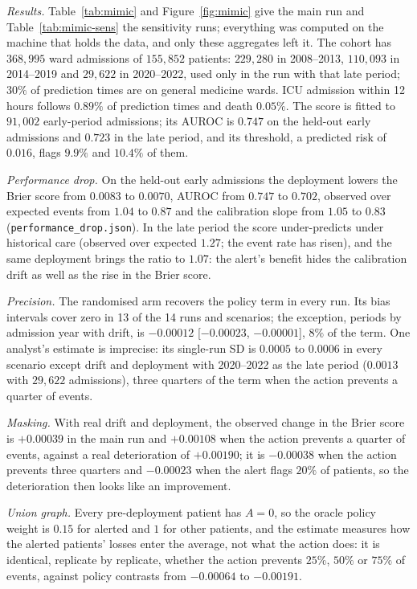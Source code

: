 \documentclass[letterpaper]{article} %
\begin{document}
\emph{Results.} Table~\ref{tab:mimic} and Figure~\ref{fig:mimic} give the
main run and Table~\ref{tab:mimic-sens} the sensitivity runs; everything was
computed on the machine that holds the data, and only these aggregates left
it. The cohort has $368{,}995$ ward admissions of $155{,}852$ patients:
$229{,}280$ in 2008--2013, $110{,}093$ in 2014--2019 and $29{,}622$ in
2020--2022, used only in the run with that late period; $30\%$ of prediction
times are on general medicine wards. ICU admission within 12 hours follows
$0.89\%$ of prediction times and death $0.05\%$. The score is fitted to
$91{,}002$ early-period admissions; its AUROC is $0.747$ on the held-out early
admissions and $0.723$ in the late period, and its threshold, a predicted risk
of $0.016$, flags $9.9\%$ and $10.4\%$ of them.

\emph{Performance drop.} On the held-out early admissions the deployment
lowers the Brier score from $0.0083$ to $0.0070$, AUROC from $0.747$ to
$0.702$, observed over expected events from $1.04$ to $0.87$ and the
calibration slope from $1.05$ to $0.83$ (\texttt{performance\_drop.json}). In
the late period the score under-predicts under historical care (observed over
expected $1.27$; the event rate has risen), and the same deployment brings the
ratio to $1.07$: the alert's benefit hides the calibration drift as well as
the rise in the Brier score.

\emph{Precision.} The randomised arm recovers the policy term in every run.
Its bias intervals cover zero in 13 of the 14 runs and scenarios; the
exception, periods by admission year with drift, is $-0.00012$ [$-0.00023$,
$-0.00001$], $8\%$ of the term. One analyst's estimate is imprecise: its
single-run SD is $0.0005$ to $0.0006$ in every scenario except drift and
deployment with 2020--2022 as the late period ($0.0013$ with $29{,}622$
admissions), three quarters of the term when the action prevents a quarter of
events.

\emph{Masking.} With real drift and deployment, the observed change in the
Brier score is $+0.00039$ in the main run and $+0.00108$ when the action
prevents a quarter of events, against a real deterioration of $+0.00190$; it
is $-0.00038$ when the action prevents three quarters and $-0.00023$ when the
alert flags $20\%$ of patients, so the deterioration then looks like an
improvement.

\emph{Union graph.} Every pre-deployment patient has $A = 0$, so the oracle
policy weight is $0.15$ for alerted and $1$ for other patients, and the
estimate measures how the alerted patients' losses enter the average, not what
the action does: it is identical, replicate by replicate, whether the action
prevents $25\%$, $50\%$ or $75\%$ of events, against policy contrasts from
$-0.00064$ to $-0.00191$.
\end{document}
